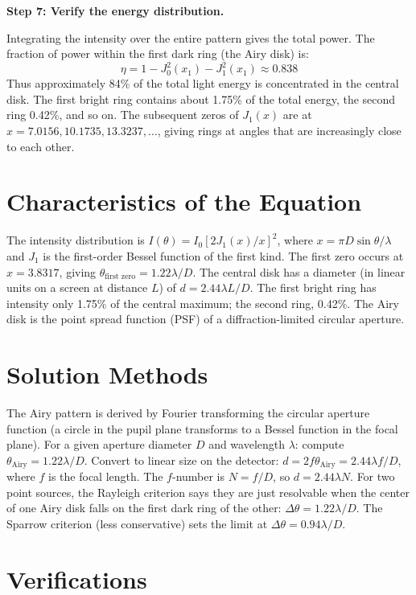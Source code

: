 \documentclass[11pt,openright]{book}
\begin{document}
\textbf{Step 7: Verify the energy distribution.}

Integrating the intensity over the entire pattern gives the total power. The fraction of power within the first dark ring (the Airy disk) is:
\begin{equation}
\eta = 1 - J_0^2(x_1) - J_1^2(x_1) \approx 0.838
\end{equation}
Thus approximately 84\% of the total light energy is concentrated in the central disk. The first bright ring contains about 1.75\% of the total energy, the second ring 0.42\%, and so on. The subsequent zeros of $J_1(x)$ are at $x = 7.0156, 10.1735, 13.3237, \ldots$, giving rings at angles that are increasingly close to each other.

\section*{Characteristics of the Equation}

The intensity distribution is $I(\theta) = I_0\left[2J_1(x)/x\right]^2$, where $x = \pi D\sin\theta/\lambda$ and $J_1$ is the first-order Bessel function of the first kind. The first zero occurs at $x = 3.8317$, giving $\theta_{\text{first zero}} = 1.22\lambda/D$. The central disk has a diameter (in linear units on a screen at distance $L$) of $d = 2.44\lambda L/D$. The first bright ring has intensity only 1.75\% of the central maximum; the second ring, 0.42\%. The Airy disk is the point spread function (PSF) of a diffraction-limited circular aperture.
\section*{Solution Methods}

The Airy pattern is derived by Fourier transforming the circular aperture function (a circle in the pupil plane transforms to a Bessel function in the focal plane). For a given aperture diameter $D$ and wavelength $\lambda$: compute $\theta_{\text{Airy}} = 1.22\lambda/D$. Convert to linear size on the detector: $d = 2f\theta_{\text{Airy}} = 2.44\lambda f/D$, where $f$ is the focal length. The $f$-number is $N = f/D$, so $d = 2.44\lambda N$. For two point sources, the Rayleigh criterion says they are just resolvable when the center of one Airy disk falls on the first dark ring of the other: $\Delta\theta = 1.22\lambda/D$. The Sparrow criterion (less conservative) sets the limit at $\Delta\theta = 0.94\lambda/D$.
\section*{Verifications}
\end{document}
